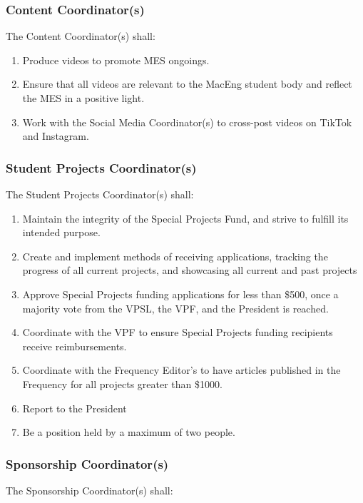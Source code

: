 \subsubsection{Content Coordinator(s)}
\label{content-coordinators}
The Content Coordinator(s) shall:

\begin{enumerate}
  \item Produce videos to promote MES ongoings.
  \item Ensure that all videos are relevant to the MacEng student body and reflect the MES in a positive light.
  \item Work with the Social Media Coordinator(s) to cross-post videos on TikTok and Instagram.
\end{enumerate}

\subsubsection{Student Projects Coordinator(s)}
\label{special-projects-coordinators}

The Student Projects Coordinator(s) shall:
\begin{enumerate}
 \item
  Maintain the integrity of the Special Projects Fund, and strive to fulfill its intended purpose.
 \item
  Create and implement methods of receiving applications, tracking the progress of all current projects, and showcasing all current and past projects
 \item
  Approve Special Projects funding applications for less than \$500, once a majority vote from the VPSL, the VPF, and the President is reached.
 \item
  Coordinate with the VPF to ensure Special Projects funding recipients receive reimbursements.
 \item
  Coordinate with the Frequency Editor's to have articles published in the Frequency for all projects greater than \$1000.
 \item
  Report to the President
 \item
  Be a position held by a maximum of two people.

\end{enumerate}

\subsubsection{Sponsorship Coordinator(s)}
\label{sponsorship-coordinators}
The Sponsorship Coordinator(s) shall:

